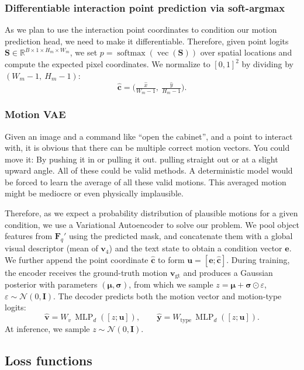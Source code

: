\subsubsection{Differentiable interaction point prediction via soft-argmax}
As we plan to use the interaction point coordinates to condition our motion prediction head, we need to make it differentiable. Therefore, given point logits $\mathbf{S}\in\mathbb{R}^{B\times 1\times H_m\times W_m}$, we set $p=\operatorname{softmax}(\operatorname{vec}(\mathbf{S}))$ over spatial locations and compute the expected pixel coordinates. We normalize to $[0,1]^2$ by dividing by $(W_m\!-\!1,\ H_m\!-\!1)$:
\[
\hat{\mathbf{c}}=\Big(\tfrac{\hat{x}}{W_m-1},\ \tfrac{\hat{y}}{H_m-1}\Big).
\]

\subsubsection{Motion VAE}
Given an image and a command like ``open the cabinet'', and a point to interact with, it is obvious that there can be multiple correct motion vectors. You could move it: By pushing it in or pulling it out. pulling straight out or at a slight upward angle. All of these could be valid methods. A deterministic model would be forced to learn the average of all these valid motions. This averaged motion might be mediocre or even physically implausible.


Therefore, as we expect a probability distribution of plausible motions for a given condition, we use a Variational Autoencoder to solve our problem. We pool object features from $\mathbf{F}_q'$ using the predicted mask, and concatenate them with a global visual descriptor (mean of $\mathbf{v}_4$) and the text state to obtain a condition vector $\mathbf{e}$. We further append the point coordinate $\hat{\mathbf{c}}$ to form $\mathbf{u}=[\mathbf{e};\hat{\mathbf{c}}]$. During training, the encoder receives the ground-truth motion $\mathbf{v}_{\text{gt}}$ and produces a Gaussian posterior with parameters $(\boldsymbol{\mu},\boldsymbol{\sigma})$, from which we sample $z=\boldsymbol{\mu}+\boldsymbol{\sigma}\odot\varepsilon$, $\varepsilon\sim\mathcal{N}(0,\mathbf{I})$. The decoder predicts both the motion vector and motion-type logits:
\[
\hat{\mathbf{v}}=W_v\,\operatorname{MLP}_d([z;\mathbf{u}]),\qquad
\hat{\mathbf{y}}=W_{\text{type}}\,\operatorname{MLP}_d([z;\mathbf{u}]).
\]
At inference, we sample $z\sim\mathcal{N}(0,\mathbf{I})$.

\subsection{Loss functions}

